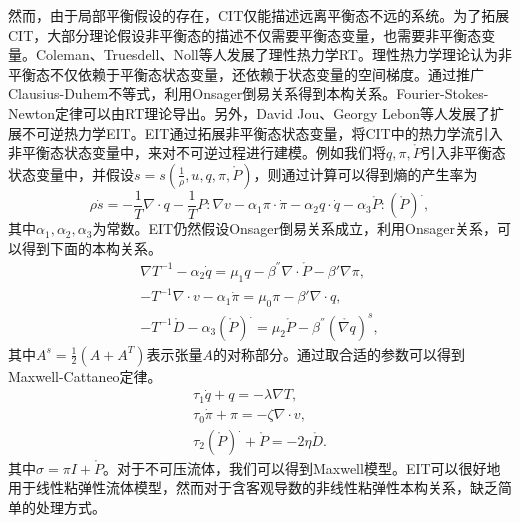 然而，由于局部平衡假设的存在，CIT仅能描述远离平衡态不远的系统。为了拓展CIT，大部分理论假设非平衡态的描述不仅需要平衡态变量，也需要非平衡态变量。Coleman、Truesdell、Noll等人发展了理性热力学RT。理性热力学理论认为非平衡态不仅依赖于平衡态状态变量，还依赖于状态变量的空间梯度。通过推广Clausius-Duhem不等式，利用Onsager倒易关系得到本构关系。Fourier-Stokes-Newton定律可以由RT理论导出\cite{jou1996extended}。另外，David Jou、Georgy Lebon等人发展了扩展不可逆热力学EIT。EIT通过拓展非平衡态状态变量，将CIT中的热力学流引入非平衡态状态变量中，来对不可逆过程进行建模。例如我们将$q,\pi,\mathring{P}$引入非平衡态状态变量中，并假设$s = s(\frac{1}{\rho}, u,q,\pi,\mathring{P} )$，则通过计算可以得到熵的产生率为
\begin{equation*}
		\rho \dot{s} = - \frac{1}{T} \nabla \cdot q - \frac{1}{T} P: \nabla v - \alpha_1 \pi \cdot \dot{\pi} - \alpha_2 q \cdot \dot{q} - \alpha_3 \mathring{P} : ({\mathring{P} })^. ,
\end{equation*}
其中$\alpha_1,\alpha_2,\alpha_3$为常数。EIT仍然假设Onsager倒易关系成立，利用Onsager关系，可以得到下面的本构关系。
\begin{subequations} \label{eq:EITconstitutive}
		\begin{align}
	\nabla T^{-1} - \alpha_2 \dot{q} = \mu_1 q - \beta^{''}\nabla \cdot \mathring{P} - \beta' \nabla \pi, \\
	-T^{-1} \nabla \cdot v - \alpha_1 \dot{\pi} = \mu_0 \pi - \beta' \nabla \cdot q , \\
	-T^{-1} \mathring{D} - \alpha_3 (\mathring{P})^. = \mu_2 \mathring{P} - \beta^{''} (\mathring{\nabla q})^s,
		\end{align}
\end{subequations}
其中$A^s = \frac{1}{2} (A+A^T)$表示张量$A$的对称部分。通过取合适的参数可以得到Maxwell-Cattaneo定律。
\begin{eqnarray*}
	\tau_1 \dot{q} + q = - \lambda \nabla T, \\
 	\tau_0 \dot{\pi } + \pi = -\zeta \nabla \cdot v, \\
 	\tau_2 (\mathring{P})^. + \mathring{P} = -2 \eta \mathring{D}.
\end{eqnarray*}
其中$\sigma = \pi I + \mathring{P}$。对于不可压流体，我们可以得到Maxwell模型。EIT可以很好地用于线性粘弹性流体模型，然而对于含客观导数的非线性粘弹性本构关系，缺乏简单的处理方式\cite{jou1996extended}。

